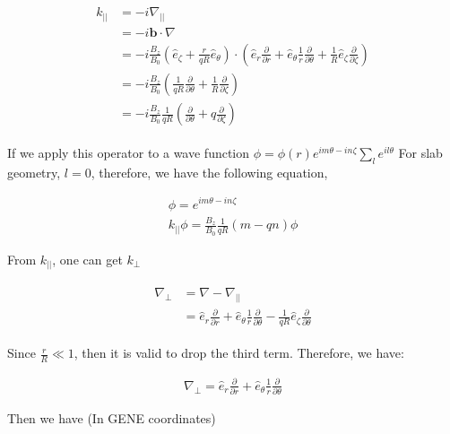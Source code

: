 \begin{eqnarray}
\begin{aligned}
    k_{||}{}&=-i\nabla_{||}\\
    &=-i\textbf{b}\cdot \nabla \\
    &=-i\frac{B_z}{B_0}(\hat{e}_{\zeta}+\frac{r}{qR}\hat{e}_{\theta})\cdot(\hat{e}_{r}\frac{\partial}{\partial r}+\hat{e}_{\theta}\frac{1}{r}\frac{\partial}{\partial \theta}+\frac{1}{R}\hat{e}_{\zeta}\frac{\partial}{\partial \zeta})\\
    &=-i\frac{B_z}{B_0}(\frac{1}{qR}\frac{\partial}{\partial \theta }+\frac{1}{R}\frac{\partial}{\partial \zeta})\\
    &= -i \frac{B_z}{B_0}\frac{1}{qR}(\frac{\partial}{\partial \theta }+q\frac{\partial}{\partial \zeta})
\end{aligned}
\end{eqnarray}

If we apply this operator to a wave function $\phi=\phi(r)e^{im\theta -in \zeta }\sum_l e^{i l\theta}$
For slab geometry, $l=0$, therefore, we have the following equation,

\begin{eqnarray}
\phi=e^{im\theta -in \zeta }\\
k_{||}\phi = \frac{B_z}{B_0}\frac{1}{qR}(m - qn)\phi
\end{eqnarray}

From $k_{||}$, one can get $k_{\perp}$ 

\begin{eqnarray}
\begin{aligned}
\nabla_{\perp}{}&=\nabla -\nabla_{||}\\
&=\hat{e}_{r}\frac{\partial}{\partial r}+\hat{e}_{\theta}\frac{1}{r}\frac{\partial}{\partial \theta}-\frac{1}{qR}\hat{e}_{\zeta}\frac{\partial}{\partial \theta}
\end{aligned}
\end{eqnarray}

Since $\frac{r}{R}\ll 1$, then it is valid to drop the third term. Therefore, we have:

\begin{eqnarray}
\nabla_{\perp}=\hat{e}_{r}\frac{\partial}{\partial r}+\hat{e}_{\theta}\frac{1}{r}\frac{\partial}{\partial \theta}
\end{eqnarray}

Then we have (In GENE coordinates)

